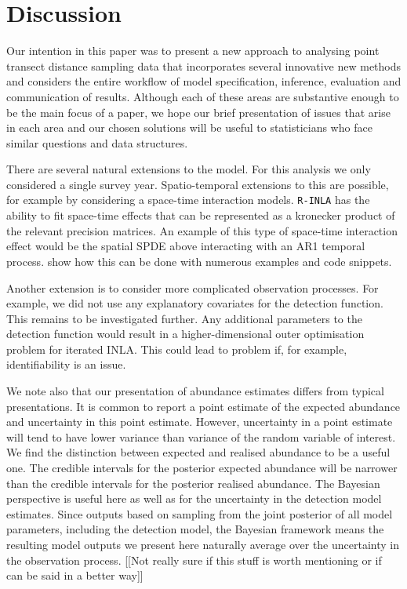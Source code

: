 \documentclass[preprint,12pt]{elsarticle}
\begin{document}
\section{Discussion}

Our intention in this paper was to present a new approach to analysing point transect distance sampling data that incorporates several innovative new methods and considers the entire workflow of model specification, inference, evaluation and communication of results.  Although each of these areas are substantive enough to be the main focus of a paper, we hope our brief presentation of issues that arise in each area and our chosen solutions will be useful to statisticians who face similar questions and data structures.

There are several natural extensions to the model.  For this analysis we only considered a single survey year.  Spatio-temporal extensions to this are possible, for example by considering a space-time interaction models.  \texttt{R-INLA} has the ability to fit space-time effects that can be represented as a kronecker product of the relevant precision matrices.  An example of this type of space-time interaction effect would be the spatial SPDE above interacting with an AR1 temporal process.  \cite{blangiardo_spatial_2013} show how this can be done with numerous examples and code snippets.    

Another extension is to consider more complicated observation processes.  For example, we did not use any explanatory covariates for the detection function.  This remains to be investigated further.  Any additional parameters to the detection function would result in a higher-dimensional outer optimisation problem for iterated INLA.  This could lead to problem if, for example, identifiability is an issue.  

We note also that our presentation of abundance estimates differs from typical presentations.  It is common to report a point estimate of the expected abundance and uncertainty in this point estimate.  However, uncertainty in a point estimate will tend to have lower variance than variance of the random variable of interest.  We find the distinction between expected and realised abundance to be a useful one. The credible intervals for the posterior expected abundance will be narrower than the credible intervals for the posterior realised abundance.  The Bayesian perspective is useful here as well as for the uncertainty in the detection model estimates.  Since outputs based on sampling from the joint posterior of all model parameters, including the detection model, the Bayesian framework means the resulting model outputs we present here naturally average over the uncertainty in the observation process.  [[Not really sure if this stuff is worth mentioning or if can be said in a better way]]
\end{document}
